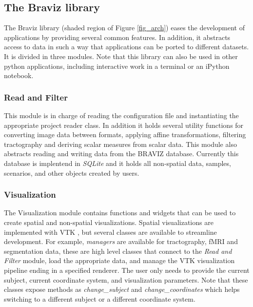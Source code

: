\documentclass[twocolumn]{svjour3}
\begin{document}
\subsection{The Braviz library}

The Braviz library (shaded region of Figure \ref{fig_arch}) eases the development of applications by providing several common features. In addition, it abstracts access to data in such a way that applications can be ported to different datasets. It is divided in three modules. Note that this library can also be used in other python applications, including interactive work in a terminal or an iPython notebook.

\subsubsection{Read and Filter}

This module is in charge of reading the configuration file and instantiating the appropriate project reader class. In addition it holds several utility functions for converting image data between formats, applying affine transformations, filtering tractography and deriving scalar measures from scalar data. This module also abstracts reading and writing data from the BRAVIZ database. Currently this database is implentend in \emph{SQLite} \cite{hipp_sqlite_2015} and it holds all non-spatial data, samples, scenarios, and other objects created by users.

\subsubsection{Visualization}

The Visualization module contains functions and widgets that can be used to create spatial and non-spatial visualizations. Spatial visualizations are implemented with VTK \cite{schroeder_design_1996} , but several classes are available to streamline development. For example, \emph{managers} are available for tractography, fMRI and segmentation data, these are high level classes that connect to the \emph{Read and Filter} module, load the appropriate data, and manage the VTK visualization pipeline ending in a specified renderer. The user only needs to provide the current subject, current coordinate system, and visualization parameters. Note that these classes expose methods as \emph{change\_subject} and \emph{change\_coordinates} which helps switching to a different subject or a different coordinate system.
\end{document}
